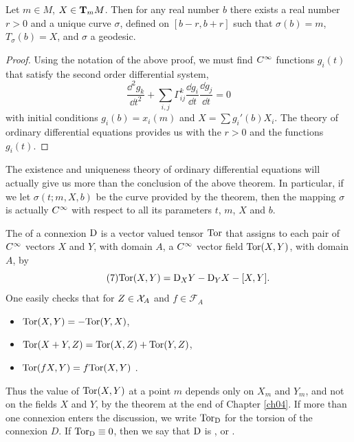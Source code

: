\documentclass[../main]{subfiles}
\begin{document}
\begin{theorem} \label{thm:ch5.1.2}
Let $m \in M$, $X \in \tangentspace{M}{m}$. Then for any real number $b$ there exists a real number $r > 0$ and a unique curve $\sigma$, defined on $[b-r,b+r]$ such that $\sigma(b) = m$, $T_\sigma(b) = X$, and $\sigma$ a geodesic.
\end{theorem}

\begin{proof}
Using the notation of the above proof, we must find $\CInfty$ functions $g_i(t)$ that satisfy the second order differential system,
\begin{equation}\label{eq:ch05.6}
\tag{6}
\frac{\dd^2 g_k}{\dd t^2} + \sum_{i,j} \Gamma_{ij}^k \frac{\dd g_i}{\dd t} \frac{\dd g_j}{\dd t} = 0
\end{equation}
with initial conditions $g_i(b) = x_i(m)$ and $X = \sum g_i'(b)X_i$. The theory of ordinary differential equations provides us with the $r>0$ and the functions $g_i(t)$.
\end{proof}



The existence and uniqueness theory of ordinary differential equations will actually give us more than the conclusion of the above theorem. In particular, if we let $\sigma(t;m,X,b)$ be the curve provided by the theorem, then the mapping $\sigma$ is actually $\CInfty$ with respect to all its parameters $t$, $m$, $X$ and $b$.

The  of a connexion $\connection$ is a vector valued tensor $\Tor$ that assigns to each pair of $\CInfty$ vectors $X$ and $Y$, with domain $A$, a $\CInfty$ vector field $\Tor(X,Y)$, with domain $A$, by
\begin{equation}\label{eq:ch05.7}\tag{7}
\Tor(X,Y) = \connection_X Y - \connection_Y X - [X,Y].
\end{equation}
One easily checks that for $Z \in \vectorFields_A$ and $f \in \mathcal{F}_A$
\begin{itemize}
    \item $\Tor(X,Y) = -\Tor(Y,X)$,
    \item $ \Tor(X+Y,Z) = \Tor(X,Z) + \Tor(Y,Z)$,
    \item $\Tor(fX,Y) = f\Tor(X,Y)$ . 
\end{itemize}
Thus the value of $\Tor(X,Y)$ at a point $m$ depends only on $X_m$ and $Y_m$, and not on the fields $X$ and $Y$, by the theorem at the end of Chapter \ref{ch04}. If more than one connexion enters the discussion, we write $\Tor_\connection$ for the torsion of the connexion $D$. If $\Tor_\connection \equiv 0$, then we say that $\connection$ is , or .
\end{document}
